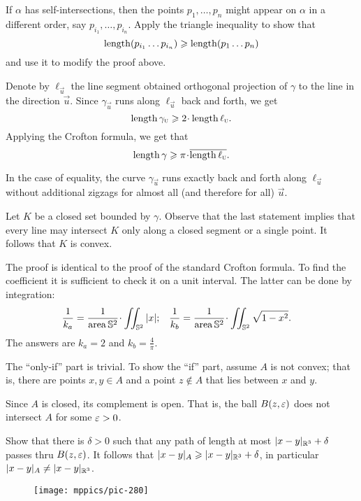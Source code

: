 If $\alpha$ has self-intersections, then the points $p_1,\dots, p_n$ might appear on $\alpha$ in a different order, say $p_{i_1},\dots,p_{i_n}$.
Apply the triangle inequality to show that 
\[\mathop{\rm length}\nolimits(p_{i_1}\dots p_{i_n})\geqslant \mathop{\rm length}\nolimits (p_1\dots p_n)\]
and use it to modify the proof above.

Denote by $\ell_{\vec u}$ the line segment 
obtained orthogonal projection of $\gamma$ to the line in the direction ${\vec u}$.
Since $\gamma_{\vec u}$ runs along $\ell_{\vec u}$ back and forth, we get 
\[\length\gamma_{\vec u}\ge 2\cdot\length\ell_{\vec u}.\]
Applying the Crofton formula, we get that 
\[\length\gamma\ge \pi\cdot \overline{\length\ell_{\vec u}}.\]

In the case of equality, the curve $\gamma_{\vec u}$ runs exactly back and forth along $\ell_{\vec u}$ without additional zigzags for almost all (and therefore for all) ${\vec u}$.

Let $K$ be a closed set bounded by $\gamma$.
Observe that the last statement implies that every line may intersect $K$ only along a closed segment or a single point.
It follows that $K$ is convex.

The proof is identical to the proof of the standard Crofton formula.
To find the coefficient it is sufficient to check it on a unit interval.
The latter can be done by integration:
\begin{align*}
\frac1{k_a}&=\frac{1}{\area \mathbb{S}^2}\cdot\iint_{\mathbb{S}^2} |x|;
&
\frac1{k_b}&=\frac{1}{\area \mathbb{S}^2}\cdot\iint_{\mathbb{S}^2} \sqrt{1-x^2}.
\end{align*}
The answers are $k_a=2$ and $k_b=\tfrac4\pi$.

The ``only-if'' part is trivial.
To show the ``if'' part, assume $A$ is not convex;
that is, there are points $x,y\in A$ and a point $z\notin A$ that lies between $x$ and $y$.

Since $A$ is closed, its complement is open.
That is, the ball $B(z,\varepsilon)$ does not intersect $A$ for some $\varepsilon>0$.

Show that there is $\delta>0$ such that any path of length at most $|x-y|_{\mathbb{R}^3}+\delta$ passes thru $B(z,\varepsilon)$.
It follows that $|x-y|_A\geqslant |x-y|_{\mathbb{R}^3}+\delta$, 
in particular $|x-y|_A\ne |x-y|_{\mathbb{R}^3}$.

\begin{wrapfigure}{r}{30 mm}
\vskip-4mm
\centering
\texttt{[image: mppics/pic-280]}
\vskip0mm
\end{wrapfigure}

